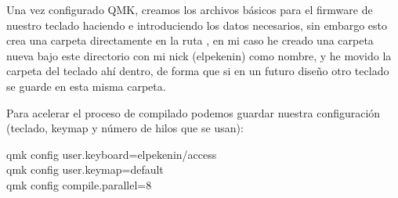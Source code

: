 Una vez configurado QMK, creamos los archivos básicos para el firmware de nuestro teclado haciendo  e introduciendo los datos necesarios, sin embargo esto crea una carpeta directamente en la ruta , en mi caso he creado una carpeta nueva bajo este directorio con mi nick (elpekenin) como nombre, y he movido la carpeta del teclado ahí dentro, de forma que si en un futuro diseño otro teclado se guarde en esta misma carpeta.

\newpage
Para acelerar el proceso de compilado podemos guardar nuestra configuración (teclado, keymap y número de hilos que se usan):
\begin{multicli}
    \cliarrow qmk config user.keyboard=elpekenin/access  \\
    \cliarrow qmk config user.keymap=default \\
    \cliarrow qmk config compile.parallel=8
\end{multicli}

\vspace*{0.5cm}
